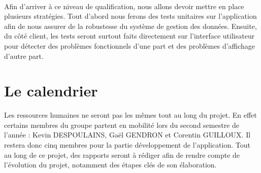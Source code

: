 \paragraph{}

Afin d’arriver à ce niveau de qualification, nous allons devoir mettre en place plusieurs  stratégies. Tout d’abord nous ferons des tests unitaires sur l’application afin de nous assurer de la robustesse du système de gestion des données. Ensuite, du côté client, les tests seront surtout faits directement sur l’interface utilisateur pour détecter des problèmes fonctionnels d’une part et des problèmes d’affichage d’autre part.

\section{Le calendrier}

Les ressources humaines ne seront pas les mêmes tout au long du projet. En effet certains membres du groupe partent en mobilité lors du second semestre de l’année : Kevin DESPOULAINS, Gaël GENDRON et Corentin GUILLOUX. Il restera donc cinq membres pour la partie développement de l’application. Tout au long de ce projet, des rapports seront à rédiger afin de rendre compte de l’évolution du projet, notamment des étapes clés de son élaboration.

